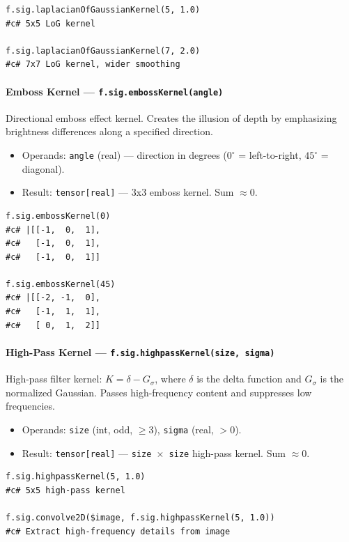 \begin{verbatim}
f.sig.laplacianOfGaussianKernel(5, 1.0)
#c# 5x5 LoG kernel

f.sig.laplacianOfGaussianKernel(7, 2.0)
#c# 7x7 LoG kernel, wider smoothing
\end{verbatim}

\paragraph{Emboss Kernel --- \texttt{f.sig.embossKernel(angle)}}

Directional emboss effect kernel. Creates the illusion of depth by emphasizing brightness differences along a specified direction.

\begin{itemize}
\item Operands: \texttt{angle} (real) --- direction in degrees ($0^\circ$ = left-to-right, $45^\circ$ = diagonal).
\item Result: \texttt{tensor[real]} --- 3x3 emboss kernel. Sum $\approx 0$.
\end{itemize}

\begin{verbatim}
f.sig.embossKernel(0)
#c# |[[-1,  0,  1],
#c#   [-1,  0,  1],
#c#   [-1,  0,  1]]

f.sig.embossKernel(45)
#c# |[[-2, -1,  0],
#c#   [-1,  1,  1],
#c#   [ 0,  1,  2]]
\end{verbatim}

\paragraph{High-Pass Kernel --- \texttt{f.sig.highpassKernel(size, sigma)}}

High-pass filter kernel: $K = \delta - G_\sigma$, where $\delta$ is the delta function and $G_\sigma$ is the normalized Gaussian. Passes high-frequency content and suppresses low frequencies.

\begin{itemize}
\item Operands: \texttt{size} (int, odd, $\geq 3$), \texttt{sigma} (real, $> 0$).
\item Result: \texttt{tensor[real]} --- \texttt{size $\times$ size} high-pass kernel. Sum $\approx 0$.
\end{itemize}

\begin{verbatim}
f.sig.highpassKernel(5, 1.0)
#c# 5x5 high-pass kernel

f.sig.convolve2D($image, f.sig.highpassKernel(5, 1.0))
#c# Extract high-frequency details from image
\end{verbatim}


